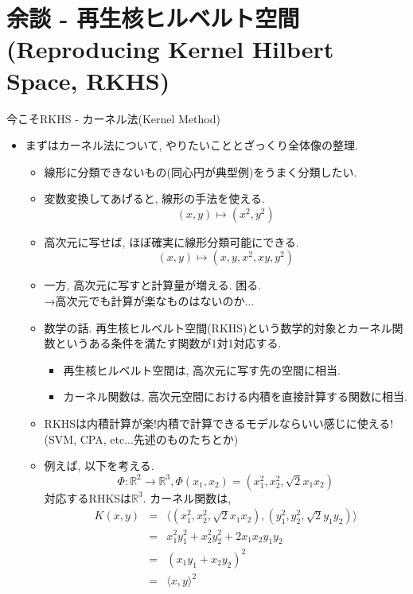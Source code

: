 \documentclass[dvipdfmx,8pt]{beamer}
\begin{document}
  \section{余談 - 再生核ヒルベルト空間\\(Reproducing Kernel Hilbert Space, RKHS)}
  \begin{frame}{今こそRKHS - カーネル法(Kernel Method)}
    \begin{itemize}
      \item まずはカーネル法について, やりたいこととざっくり全体像の整理. \\
        \begin{itemize}
          \item 線形に分類できないもの(同心円が典型例)をうまく分類したい.
          \item 変数変換してあげると, 線形の手法を使える. \\
            \[
              (x,y) \mapsto (x^2,y^2)
            \]
          \item 高次元に写せば, ほぼ確実に線形分類可能にできる.
            \[
              (x,y)\mapsto (x,y,x^2,xy,y^2)
            \]
          \item 一方, 高次元に写すと計算量が増える. 困る. \\
            →高次元でも計算が楽なものはないのか...
          \item 数学の話. 再生核ヒルベルト空間(RKHS)という数学的対象とカーネル関数というある条件を満たす関数が1対1対応する.
            \begin{itemize}
              \item 再生核ヒルベルト空間は, 高次元に写す先の空間に相当. 
              \item カーネル関数は, 高次元空間における内積を直接計算する関数に相当. 
            \end{itemize}
          \item RKHSは内積計算が楽!内積で計算できるモデルならいい感じに使える!\\
            (SVM, CPA, etc...先述のものたちとか)
          \item 例えば, 以下を考える. 
            \[
              \Phi\colon \mathbb{R}^2\to\mathbb{R}^3, \Phi(x_1,x_2)=(x_1^2,x_2^2,\sqrt{2}x_1x_2)
            \]
            対応するRHKSは$\mathbb{R}^3$.
            カーネル関数は, 
            \begin{eqnarray*}
              K(x,y)&=&\langle(x_1^2,x_2^2,\sqrt{2}x_1x_2),(y_1^2,y_2^2,\sqrt{2}y_1y_2)\rangle\\
              &=&x_1^2y_1^2+x_2^2y_2^2+2x_1x_2y_1y_2\\
              &=&(x_1y_1+x_2y_2)^2\\
              &=&\langle x,y\rangle^2
            \end{eqnarray*}
        \end{itemize}
    \end{itemize}
  \end{frame}
\end{document}
